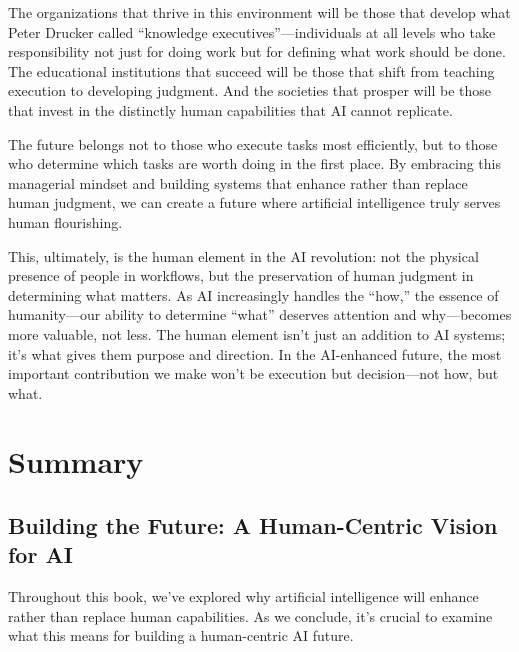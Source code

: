 \documentclass[
  Letterpaper,
]{scrbook}
\begin{document}
The organizations that thrive in this environment will be those that
develop what Peter Drucker called ``knowledge executives''---individuals
at all levels who take responsibility not just for doing work but for
defining what work should be done. The educational institutions that
succeed will be those that shift from teaching execution to developing
judgment. And the societies that prosper will be those that invest in
the distinctly human capabilities that AI cannot replicate.

The future belongs not to those who execute tasks most efficiently, but
to those who determine which tasks are worth doing in the first place.
By embracing this managerial mindset and building systems that enhance
rather than replace human judgment, we can create a future where
artificial intelligence truly serves human flourishing.

This, ultimately, is the human element in the AI revolution: not the
physical presence of people in workflows, but the preservation of human
judgment in determining what matters. As AI increasingly handles the
``how,'' the essence of humanity---our ability to determine ``what''
deserves attention and why---becomes more valuable, not less. The human
element isn't just an addition to AI systems; it's what gives them
purpose and direction. In the AI-enhanced future, the most important
contribution we make won't be execution but decision---not how, but
what.


\chapter*{Summary}\label{summary}


\section*{Building the Future: A Human-Centric Vision for
AI}\label{building-the-future-a-human-centric-vision-for-ai-1}


Throughout this book, we've explored why artificial
intelligence will enhance
rather than replace human
capabilities. As we
conclude, it's crucial to examine what this means for building a
human-centric AI future.
\end{document}
